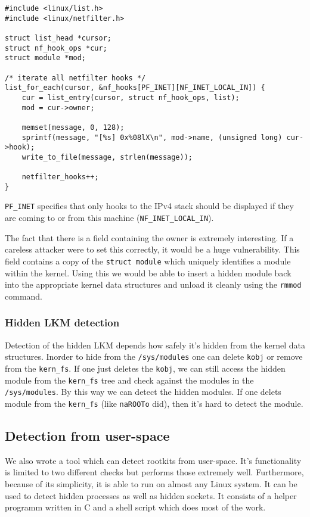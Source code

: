 \documentclass[10pt, letterpaper]{scrartcl}
\begin{document}
\begin{lstlisting}
#include <linux/list.h>
#include <linux/netfilter.h>

struct list_head *cursor;
struct nf_hook_ops *cur;
struct module *mod;

/* iterate all netfilter hooks */
list_for_each(cursor, &nf_hooks[PF_INET][NF_INET_LOCAL_IN]) {
	cur = list_entry(cursor, struct nf_hook_ops, list);
	mod = cur->owner;
	
	memset(message, 0, 128);
	sprintf(message, "[%s] 0x%08lX\n", mod->name, (unsigned long) cur->hook);
	write_to_file(message, strlen(message));
	
	netfilter_hooks++;
}
\end{lstlisting}

\texttt{PF\_INET} specifies that only hooks to the IPv4 stack should be displayed if they are coming to or from this machine (\texttt{NF\_INET\_LOCAL\_IN}).

The fact that there is a field containing the owner is extremely interesting.
If a careless attacker were to set this correctly, it would be a huge vulnerability.
This field contains a copy of the \texttt{struct module} which uniquely identifies a module within the kernel.
Using this we would be able to insert a hidden module back into the appropriate kernel data structures and unload it cleanly using the \texttt{rmmod} command.

\subsubsection{Hidden LKM detection}
Detection of the hidden LKM depends how safely it's hidden from the kernel data structures. 
Inorder to hide from the \texttt{/sys/modules} one can delete \texttt{kobj} or remove from the \texttt{kern\_fs}. 
If one just deletes the \texttt{kobj}, we can still access the hidden module from the \texttt{kern\_fs} tree and check 
against the modules in the \texttt{/sys/modules}. By this way we can detect the hidden modules. 
If one delets module from the \texttt{kern\_fs} (like \texttt{naROOTo} did), then it's hard to detect the module.

\subsection{Detection from user-space}\label{sec:script}
We also wrote a tool which can detect rootkits from user-space.
It's functionality is limited to two different checks but performs those extremely well.
Furthermore, because of its simplicity, it is able to run on almost any Linux system.
It can be used to detect hidden processes as well as hidden sockets.
It consists of a helper programm written in C and a shell script which does most of the work.
\end{document}
